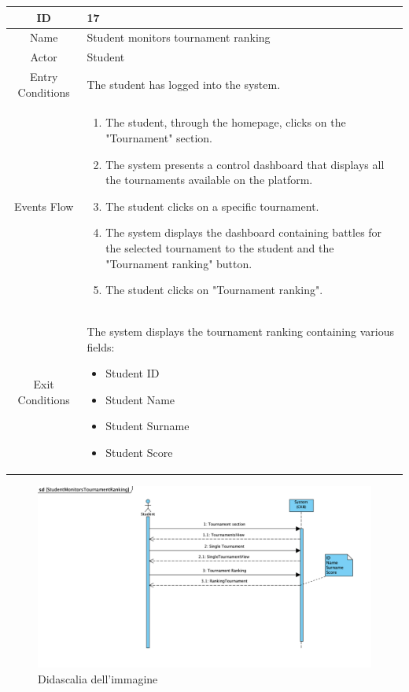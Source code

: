 \begin{longtable}{|c| p{10cm}|}
    \hline
        ID & 17 \\
    \hline
        Name & Student monitors tournament ranking \\
    \hline
        Actor & Student \\
    \hline
        Entry Conditions & 
The student has logged into the system.
\\
    \hline
        Events Flow &   \begin{enumerate}
                            \item The student, through the homepage, clicks on the "Tournament" section.
                            \item The system presents a control dashboard that displays all the tournaments available on the platform.
                            \item The student clicks on a specific tournament.
                            \item The system displays the dashboard containing battles for the selected tournament to the student and the "Tournament ranking" button.
                            \item The student clicks on "Tournament ranking".
                        \end{enumerate} \\
    \hline
        Exit Conditions &

The system displays the tournament ranking containing various fields:
            \begin{itemize}
                                \item Student ID
                                \item Student Name
                                \item Student Surname
                                \item Student Score
                            \end{itemize}
\\
    \hline
\end{longtable}

    \begin{figure}[H]
  \includegraphics[width=1\linewidth]{SequenceDiagram/StudTournamentRanking.png} 
  \caption{Didascalia dell'immagine}
  \label{fig:immagine}
\end{figure}


